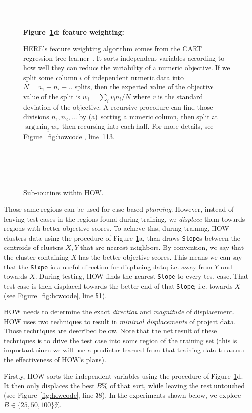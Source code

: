 \documentclass[conference]{IEEEtran}
\newcommand{\fig}[1]{Figure~\ref{fig:#1}}
\DeclareMathOperator*{\argmin}{arg\,min}
\begin{document}
\begin{figure}[b!]
~\hrule~

{\bf \fig{where}d: feature weighting:}

HERE's feature weighting algorithm
comes from the CART regression tree learner~\cite{Breiman1984}.
It sorts independent variables
 according to how well they can reduce the variability
of a  numeric objective.
If we split some column $i$ of independent numeric data  into $N=n_1 + n_2 + ..$ splits,
then the expected
value of the objective value of the split  is $w_i = \sum_i v_in_i/N$
where $v$ is the standard deviation of the objective.
A recursive procedure can  find those divisions $n_1,n_2,...$ by (a)~sorting a numeric column,
then split at $\argmin_i w_i$, then recursing into each half.  For more details, see  \fig{howcode}, line~113.

~\hrule~
 
\caption{Sub-routines within HOW.}\label{fig:where}
\end{figure}





Those same regions can be used for case-based 
{\em planning}. However,  instead of leaving test cases in the regions
found during training, we {\em displace} them towards regions
with better objective scores.
To achieve this, 
during training, HOW clusters data using the procedure of \fig{where}a,
then draws {\tt Slope}s between the centroids of  clusters $X,Y$ that are nearest
neighbors.
By convention, we say that the cluster containing $X$ has the  better objective scores. This means we can say that the {\tt Slope} is a useful direction for displacing
data; i.e.  away from $Y$ and towards $X$. 
 During testing,  HOW   finds the  nearest {\tt Slope} to every test case. That  test case is   then displaced towards the better end
of that {\tt Slope}; i.e. towards  $X$ (see \fig{howcode}, line 51).

 HOW needs to  determine the  exact {\em direction} and {\em magnitude} of 
displacement.   
HOW uses two techniques to result in 
{\em minimal displacements} of project data. Those techniques are described below. Note
 that the net result of these techniques is to drive the test case into some region of the training 
 set (this is important since we will use a predictor learned from that training data to assess
 the effectiveness of HOW's plans).
 
 Firstly,
HOW sorts  the independent variables
using the procedure of  \fig{where}d. It then only
displaces the    best $B$\%  of that sort, while leaving the rest untouched
(see \fig{howcode}, line 38).
In  the experiments shown below,  we explore   \mbox{$B \in \{25,50,100\}\%$}.
\end{document}
